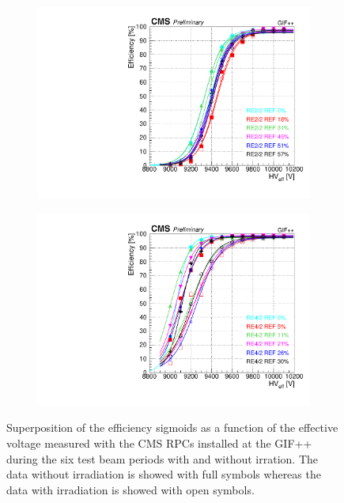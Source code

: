 \begin{figure}[H]
\begin{subfigure}{0.5\linewidth}
    		\includegraphics[width = \linewidth]{fig/chapt5/efficiency_vs_HVeff_RE2_2-REF.pdf}
        	\caption{\label{fig:GIFpp_eff_vs_HVeff:C}}
    	\end{subfigure}
    	\begin{subfigure}{0.5\linewidth}
			\centering
    		\includegraphics[width = \linewidth]{fig/chapt5/efficiency_vs_HVeff_RE4_2-REF.pdf}
        	\caption{\label{fig:GIFpp_eff_vs_HVeff:D}}
    	\end{subfigure}
		\caption{\label{fig:GIFpp_eff_vs_HVeff} Superposition of the efficiency sigmoids as a function of the effective voltage measured with the CMS RPCs installed at the GIF++ during the six test beam periods with and without irration. The data without irradiation is showed with full symbols whereas the data with irradiation is showed with open symbols.}
	\end{figure}
	
